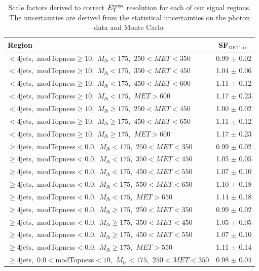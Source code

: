 \begin{table}[htbp]
\centering
\caption{Scale factors derived to correct $E_\text{T}^\text{miss}$ resolution for each
  of our signal regions. The uncertainties are derived from the
  statistical uncertainties on the photon data and Monte Carlo.}
\label{tab:metres:scalefactors}
\begin{tabular}{|l|c|}
\hline
Region  &  SF$_\text{MET res.}$ \\
\hline
$<4$jets,~modTopness$\ge10$,~$M_{lb}<175$,~$250<MET<350$        &  0.99 $\pm$ 0.02 \\
$<4$jets,~modTopness$\ge10$,~$M_{lb}<175$,~$350<MET<450$        &  1.04 $\pm$ 0.06 \\
$<4$jets,~modTopness$\ge10$,~$M_{lb}<175$,~$450<MET<600$        &  1.11 $\pm$ 0.12 \\
$<4$jets,~modTopness$\ge10$,~$M_{lb}<175$,~$MET>600$            &  1.17 $\pm$ 0.23 \\
\hline
$<4$jets,~modTopness$\ge10$,~$M_{lb}\ge175$,~$250<MET<450$      &  1.00 $\pm$ 0.02 \\
$<4$jets,~modTopness$\ge10$,~$M_{lb}\ge175$,~$450<MET<650$      &  1.11 $\pm$ 0.12 \\
$<4$jets,~modTopness$\ge10$,~$M_{lb}\ge175$,~$MET>600$          &  1.17 $\pm$ 0.23 \\
\hline
$\ge4$jets,~modTopness$<0.0$,~$M_{lb}<175$,~$250<MET<350$       &  0.99 $\pm$ 0.02 \\
$\ge4$jets,~modTopness$<0.0$,~$M_{lb}<175$,~$350<MET<450$       &  1.05 $\pm$ 0.05 \\
$\ge4$jets,~modTopness$<0.0$,~$M_{lb}<175$,~$450<MET<550$       &  1.07 $\pm$ 0.10 \\
$\ge4$jets,~modTopness$<0.0$,~$M_{lb}<175$,~$550<MET<650$       &  1.10 $\pm$ 0.18 \\
$\ge4$jets,~modTopness$<0.0$,~$M_{lb}<175$,~$MET>650$           &  1.14 $\pm$ 0.18 \\
\hline
$\ge4$jets,~modTopness$<0.0$,~$M_{lb}\ge175$,~$250<MET<350$     &  0.99 $\pm$ 0.02 \\
$\ge4$jets,~modTopness$<0.0$,~$M_{lb}\ge175$,~$350<MET<450$     &  1.05 $\pm$ 0.05 \\
$\ge4$jets,~modTopness$<0.0$,~$M_{lb}\ge175$,~$450<MET<550$     &  1.07 $\pm$ 0.10 \\
$\ge4$jets,~modTopness$<0.0$,~$M_{lb}\ge175$,~$MET>550$         &  1.11 $\pm$ 0.14 \\
\hline
$\ge4$jets,~$0.0<$modTopness$<10$,~$M_{lb}<175$,~$250<MET<350$  &  0.98 $\pm$ 0.04 \\

\end{tabular}
\end{table}
